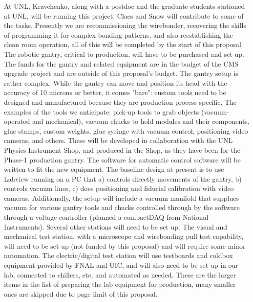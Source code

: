At UNL, Kravchenko, along with a postdoc and the graduate students stationed at UNL, will be running this project. Claes and Snow will contribute to some of the tasks. Presently we are recommissioning the wirebonder, recovering the skills of programming it for complex bonding patterns, and also reestablishing the clean room operation, all of this will be completed by the start of this proposal. The robotic gantry, critical to production, will have to be purchased and set up. The funds for the gantry and related equipment are in the budget of the CMS upgrade project and are outside of this proposal's budget. The gantry setup is rather complex. While the gantry can move and position its head with the accuracy of 10 microns or better, it comes "bare": custom tools need to be designed and manufactured because they are production process-specific. The examples of the tools we anticipate: pick-up tools to grab objects (vacuum-operated and mechanical), vacuum chucks to hold modules and their components, glue stamps, custom weights, glue syringe with vacuum control, positioning video cameras, and others. These will be developed in collaboration with the UNL Physics Instrument Shop, and produced in the Shop, as they have been for the Phase-1 production gantry. The software for automatic control software will be written to fit the new equipment. The baseline design at present is to use Labview running on a PC that a) controls directly movements of the gantry, b) controls vacuum lines, c) does positioning and fiducial calibration with video cameras. Additionally, the setup will include a vacuum manifold that supplues vacuum for various gantry tools and chucks controlled through by the software through a voltage controller (planned a compactDAQ from National Instruments). Several other stations will need to be set up. The visual and mechanical test station, with a microscope and wirebonding pull test capability, will need to be set up (not funded by this proposal) and will require some minor automation. The electric/digital test station will use testboards and coldbox equipment provided by FNAL and UIC, and will also need
to be set up in our lab, connected to chillers, etc, and automated as needed. These are the larger items in the list of preparing the lab equipment for production, many smaller ones are skipped due to page limit of this proposal.

